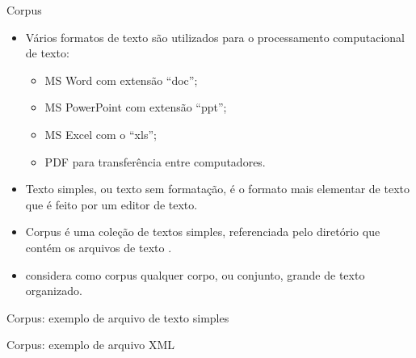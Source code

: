 \documentclass[%
  10pt,%
  aspectratio = 169,%
  compress,%
  t,%
]{beamer}%
\begin{document}
    \begin{frame}{}{Corpus}
        \begin{itemize}
            \item Vários formatos de texto são utilizados para o processamento computacional de texto:
            \begin{itemize}
                \item MS Word com extensão ``doc'';
                \item MS PowerPoint com extensão ``ppt'';
                \item MS Excel com o ``xls'';
                \item PDF para transferência entre computadores.
            \end{itemize}
            \item Texto simples, ou texto sem formatação, é o formato mais elementar de texto que é feito por um editor de texto.
            
            \item Corpus é uma coleção de textos simples, referenciada pelo diretório que contém os arquivos de texto \cite[p.~6]{Jo2018TMCIBDC}.
            
            \item \cite[p.~9]{KwartlerTMPWR2017} considera como corpus qualquer corpo, ou conjunto, grande de texto organizado.
        \end{itemize}
    \end{frame}
    
    \begin{frame}{}{Corpus: exemplo de arquivo de texto simples}
        
    \end{frame}
    
    \begin{frame}[fragile = singleslide]{}{Corpus: exemplo de arquivo XML}
        
    \end{frame}
    
\end{document}
